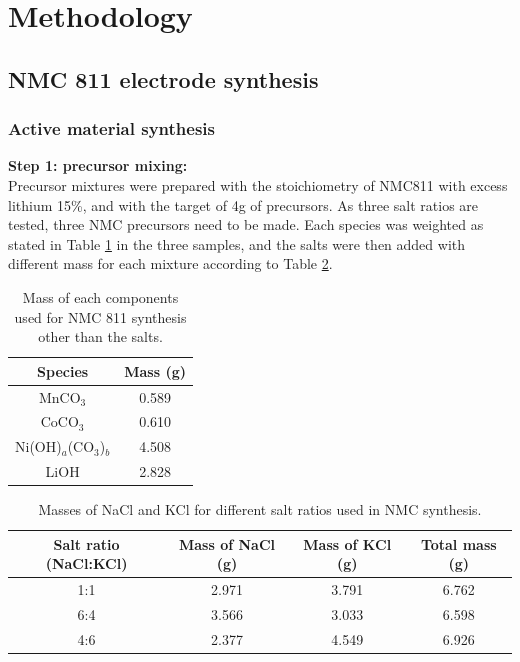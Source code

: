 \documentclass{article}
\begin{document}
\section {Methodology} 
\subsection{NMC 811 electrode synthesis}

\subsubsection{Active material synthesis}

\textbf{Step 1: precursor mixing: }\\
Precursor mixtures were prepared with the stoichiometry of NMC811
 with excess lithium 15\%, and with the target of 4g of precursors. As three salt ratios are tested, three NMC precursors need to be made. Each species was weighted as stated in Table \ref{t1} in the three samples, and the salts were then added with different mass for each mixture according to Table \ref{t2}.
\begin{table}[h!]
    \centering
    \begin{tabular}{|c|c|}
        \hline
        \textbf{Species} & \textbf{Mass (g)} \\ 
        \hline
        MnCO$_3$ & 0.589 \\
        CoCO$_3$ & 0.610 \\
        Ni(OH)$_a$(CO$_3$)$_b$ & 4.508 \\
        LiOH & 2.828 \\
        \hline
    \end{tabular}
    \caption{Mass of each components used for NMC 811 synthesis other than the salts.}
    \label{t1}
    
\end{table}
\begin{table}[h!]
  \centering
  \begin{tabular}{|c|c|c|c|}
    \hline
    \textbf{Salt ratio (NaCl:KCl)} & \textbf{Mass of NaCl (g)} & \textbf{Mass of KCl (g)} & \textbf{Total mass (g)} \\ 
    \hline
    1:1 & 2.971 & 3.791 & 6.762 \\ 
    6:4 & 3.566 & 3.033 & 6.598 \\ 
    4:6 & 2.377 & 4.549 & 6.926 \\ 
    \hline
  \end{tabular}
  \caption{Masses of NaCl and KCl for different salt ratios used in NMC synthesis.}
  \label{t2}
\end{table}
\end{document}
